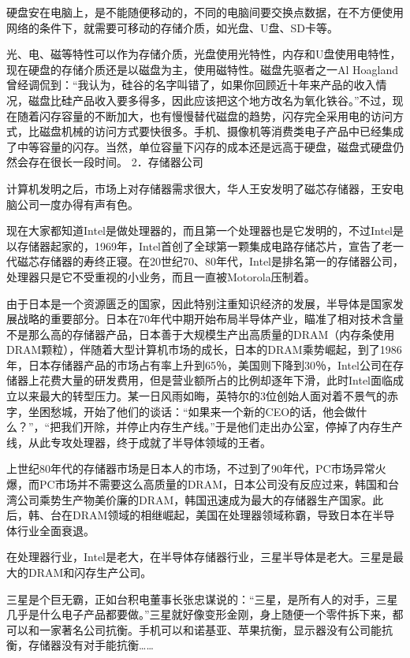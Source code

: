 \documentclass[12pt,UTF8]{ctexbook}
\begin{document}
硬盘安在电脑上，是不能随便移动的，不同的电脑间要交换点数据，在不方便使用网络的条件下，就需要可移动的存储介质，如光盘、U盘、SD卡等。

光、电、磁等特性可以作为存储介质，光盘使用光特性，内存和U盘使用电特性，现在硬盘的存储介质还是以磁盘为主，使用磁特性。磁盘先驱者之一Al Hoagland曾经调侃到：“我认为，硅谷的名字叫错了，如果你回顾近十年来产品的收入情况，磁盘比硅产品收入要多得多，因此应该把这个地方改名为氧化铁谷。”不过，现在随着闪存容量的不断加大，也有慢慢替代磁盘的趋势，闪存完全采用电的访问方式，比磁盘机械的访问方式要快很多。手机、摄像机等消费类电子产品中已经集成了中等容量的闪存。当然，单位容量下闪存的成本还是远高于硬盘，磁盘式硬盘仍然会存在很长一段时间。
2．存储器公司

计算机发明之后，市场上对存储器需求很大，华人王安发明了磁芯存储器，王安电脑公司一度办得有声有色。

现在大家都知道Intel是做处理器的，而且第一个处理器也是它发明的，不过Intel是以存储器起家的，1969年，Intel首创了全球第一颗集成电路存储芯片，宣告了老一代磁芯存储器的寿终正寝。在20世纪70、80年代，Intel是排名第一的存储器公司，处理器只是它不受重视的小业务，而且一直被Motorola压制着。

由于日本是一个资源匮乏的国家，因此特别注重知识经济的发展，半导体是国家发展战略的重要部分。日本在70年代中期开始布局半导体产业，瞄准了相对技术含量不是那么高的存储器产品，日本善于大规模生产出高质量的DRAM（内存条使用DRAM颗粒），伴随着大型计算机市场的成长，日本的DRAM乘势崛起，到了1986年，日本存储器产品的市场占有率上升到65％，美国则下降到30％，Intel公司在存储器上花费大量的研发费用，但是营业额所占的比例却逐年下滑，此时Intel面临成立以来最大的转型压力。某一日风雨如晦，英特尔的3位创始人面对着不景气的赤字，坐困愁城，开始了他们的谈话：“如果来一个新的CEO的话，他会做什么？”，“把我们开除，并停止内存生产线。”于是他们走出办公室，停掉了内存生产线，从此专攻处理器，终于成就了半导体领域的王者。

上世纪80年代的存储器市场是日本人的市场，不过到了90年代，PC市场异常火爆，而PC市场并不需要这么高质量的DRAM，日本公司没有反应过来，韩国和台湾公司乘势生产物美价廉的DRAM，韩国迅速成为最大的存储器生产国家。此后，韩、台在DRAM领域的相继崛起，美国在处理器领域称霸，导致日本在半导体行业全面衰退。

在处理器行业，Intel是老大，在半导体存储器行业，三星半导体是老大。三星是最大的DRAM和闪存生产公司。

三星是个巨无霸，正如台积电董事长张忠谋说的：“三星，是所有人的对手，三星几乎是什么电子产品都要做。”三星就好像变形金刚，身上随便一个零件拆下来，都可以和一家著名公司抗衡。手机可以和诺基亚、苹果抗衡，显示器没有公司能抗衡，存储器没有对手能抗衡……
\end{document}
